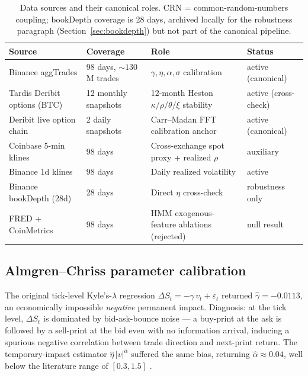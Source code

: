 \documentclass[11pt,letterpaper]{article}
\begin{document}
\begin{table}[!htb]
\centering
\caption{Data sources and their canonical roles. CRN = common-random-numbers coupling; bookDepth coverage is 28 days, archived locally for the robustness paragraph (Section~\ref{sec:bookdepth}) but not part of the canonical pipeline.}
\label{tab:data}
\small
\begin{tabular}{l l l l}
\toprule
\textbf{Source} & \textbf{Coverage} & \textbf{Role} & \textbf{Status} \\
\midrule
Binance aggTrades & 98 days, \(\sim130\)M trades & \(\gamma,\eta,\alpha,\sigma\) calibration & active (canonical) \\
Tardis Deribit options (BTC) & 12 monthly snapshots & 12-month Heston \(\kappa/\rho/\theta/\xi\) stability & active (cross-check) \\
Deribit live option chain & 2 daily snapshots & Carr--Madan FFT calibration anchor & active (canonical) \\
Coinbase 5-min klines & 98 days & Cross-exchange spot proxy + realized \(\rho\) & auxiliary \\
Binance 1d klines & 98 days & Daily realized volatility & active \\
Binance bookDepth (28d) & 28 days & Direct \(\eta\) cross-check & robustness only \\
FRED + CoinMetrics & 98 days & HMM exogenous-feature ablations (rejected) & null result \\
\bottomrule
\end{tabular}
\end{table}

\subsection{Almgren--Chriss parameter calibration}
\label{sec:calibration}

The original tick-level Kyle's-\(\lambda\) regression \(\Delta S_t = -\gamma\, v_t + \varepsilon_t\) returned \(\hat\gamma = -0.0113\), an economically impossible \emph{negative} permanent impact. Diagnosis: at the tick level, \(\Delta S_t\) is dominated by bid-ask-bounce noise --- a buy-print at the ask is followed by a sell-print at the bid even with no information arrival, inducing a spurious negative correlation between trade direction and next-print return. The temporary-impact estimator \(\hat\eta\, |v|^{\hat\alpha}\) suffered the same bias, returning \(\hat\alpha\approx 0.04\), well below the literature range of \([0.3, 1.5]\) \citep{almgren2003optimal,gatheral2010no}.
\end{document}
